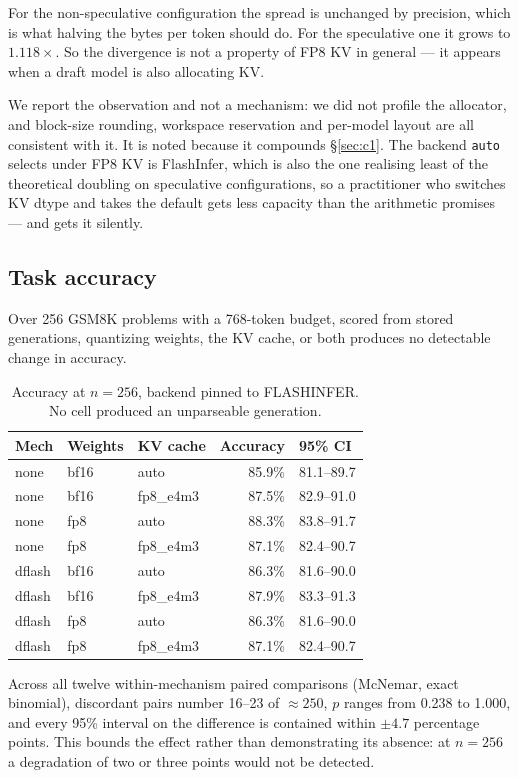 \documentclass[11pt]{article}
\newcommand{\tw}[1]{\texttt{\small #1}}
\begin{document}
\noindent
For the non-speculative configuration the spread is unchanged by precision,
which is what halving the bytes per token should do. For the speculative one
it grows to $1.118\times$. So the divergence is not a
property of FP8 KV in general --- it appears when a draft model is also
allocating KV.

We report the observation and not a mechanism: we did not profile the
allocator, and block-size rounding, workspace reservation and per-model
layout are all consistent with it. It is noted because it compounds
\S\ref{sec:c1}. The backend \tw{auto} selects under FP8 KV is FlashInfer,
which is also the one realising least of the theoretical doubling on
speculative configurations, so a practitioner who switches KV dtype and
takes the default gets less capacity than the arithmetic promises --- and
gets it silently.

\subsection{Task accuracy}

Over 256 GSM8K problems with a 768-token budget, scored from stored
generations, quantizing weights, the KV cache, or both produces no detectable
change in accuracy.

\begin{table}[h]\centering\small
\caption{Accuracy at $n=256$, backend pinned to FLASHINFER. No cell produced
an unparseable generation.}
\begin{tabular}{lllrl}
\toprule
Mech & Weights & KV cache & Accuracy & 95\% CI\\
\midrule
none & bf16 & auto & 85.9\% & 81.1--89.7\\
none & bf16 & fp8\_e4m3 & 87.5\% & 82.9--91.0\\
none & fp8 & auto & 88.3\% & 83.8--91.7\\
none & fp8 & fp8\_e4m3 & 87.1\% & 82.4--90.7\\
dflash & bf16 & auto & 86.3\% & 81.6--90.0\\
dflash & bf16 & fp8\_e4m3 & 87.9\% & 83.3--91.3\\
dflash & fp8 & auto & 86.3\% & 81.6--90.0\\
dflash & fp8 & fp8\_e4m3 & 87.1\% & 82.4--90.7\\
\bottomrule
\end{tabular}
\end{table}

\noindent
Across all twelve within-mechanism paired comparisons (McNemar, exact
binomial), discordant pairs number 16--23 of ${\approx}250$, $p$ ranges from
0.238 to 1.000, and every 95\% interval on the difference is contained within
$\pm4.7$ percentage points. This bounds the effect rather than demonstrating
its absence: at $n=256$ a degradation of two or three points would not be
detected.
\end{document}
